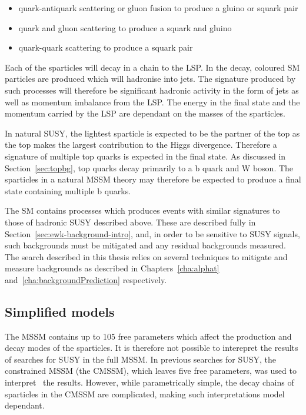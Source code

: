 \begin{itemize}
\item quark-antiquark scattering or gluon fusion to produce a gluino or squark pair
\item quark and gluon scattering to produce a squark and gluino
\item quark-quark scattering to produce a squark pair
\end{itemize}

Each of the sparticles will decay in a chain to the LSP. In the decay, 
coloured SM particles are produced which will hadronise into jets.
The signature produced by such processes will therefore be significant hadronic activity in 
the form of jets as well as momentum imbalance from the LSP. The energy in
the final state and the momentum carried by the LSP are dependant on the masses
of the sparticles.

In natural SUSY, the lightest sparticle is expected to be the partner of the top
as the top makes the largest contribution to the Higgs divergence. Therefore a signature
of multiple top quarks is expected in the final state. As discussed in Section~\ref{sec:topbg}, top quarks
decay primarily to a b quark and W boson. The sparticles in a natural MSSM theory may therefore be expected
to produce a final state containing multiple b quarks.

The SM contains processes which produces events with similar signatures to 
those of hadronic SUSY described above. These are described fully in Section~\ref{sec:ewk-background-intro},
and, in order to be sensitive to SUSY signals, such backgrounds must be mitigated 
and any residual backgrounds measured. The search described in this thesis relies on several
techniques to mitigate and measure backgrounds as described in Chapters~\ref{cha:alphat} and~\ref{cha:backgroundPrediction}
respectively.

\subsection{Simplified models}

The MSSM contains up to 105 free parameters which affect the production and decay modes of the sparticles.
It is therefore not possible to interepret the results of searches for SUSY in the full MSSM. 
In previous searches for SUSY, the constrained MSSM (the CMSSM), which leaves five free parameters, was 
used to interpret~\cite{SMS} the results. However, while parametrically simple, the decay chains of sparticles 
in the CMSSM are complicated, making such interpretations model dependant. 

